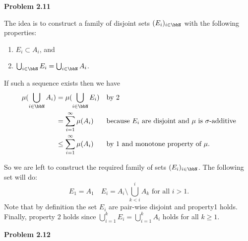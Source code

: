 \bigskip 

\textbf{Problem 2.11}

The idea is to construct a family of disjoint sets $(E_i)_{i \in \bbN}$ with the following properties:
\begin{enumerate}
\item $E_i \subset A_i$, and
\item $\bigcup_{i \in \bbN} E_i = \bigcup_{i \in \bbN} A_i$.
\end{enumerate}

If such a sequence exists then we have
\begin{align*}
	\mu(\bigcup_{i \in \bbN} A_i) &= \mu(\bigcup_{i \in \bbN} E_i) &&\text{by 2}\\
	&= \sum_{i = 1}^\infty \mu(A_i) &&\text{because $E_i$ are disjoint and $\mu$ is $\sigma$-additive}\\
	&\le \sum_{i = 1}^\infty \mu(A_i) &&\text{by 1 and monotone property of $\mu$}.
\end{align*}

So we are left to construct the required family of sets $(E_i)_{i \in \bbN}$. The following set will do:
\[
	E_1 = A_1 \quad E_i = A_i \setminus \bigcup_{k < i}^i A_k \text{ for all } i > 1.
\]
Note that by definition the set $E_i$ are pair-wise disjoint and property1 holds. Finally, property 2 holds since $\bigcup_{i = 1}^k E_i = \bigcup_{i = 1}^k A_i$ holds for all $k \ge 1$.

\bigskip

\textbf{Problem 2.12}

